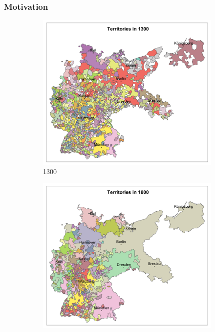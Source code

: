 \documentclass{beamer}
\begin{document}
\begin{frame}
\frametitle{Motivation}

\begin{figure}
     \centering
     \begin{subfigure}[b]{0.3\textwidth}
         \centering
         \includegraphics[width=\textwidth]{paper/output/slides/map_terrs_1300.png}
         \caption{1300}
         \label{fig:map1300}
     \end{subfigure}
     \hfill
     \begin{subfigure}[b]{0.3\textwidth}
         \centering
         \includegraphics[width=\textwidth]{paper/output/slides/map_terrs_1800.png}

\end{subfigure}
\end{figure}
\end{frame}
\end{document}
